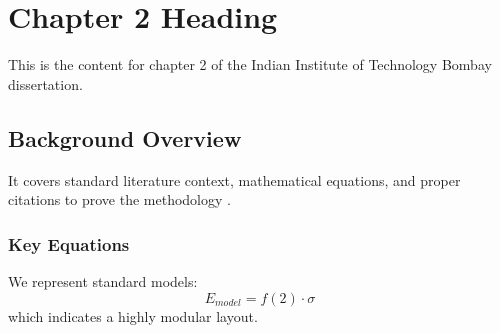 \chapter{Chapter 2 Heading}
\label{ch:chapter2}
This is the content for chapter 2 of the Indian Institute of Technology Bombay dissertation.

\section{Background Overview}
It covers standard literature context, mathematical equations, and proper citations to prove the methodology \cite{texbook}.

\subsection{Key Equations}
We represent standard models:
\begin{equation}
    E_{model} = f(2) \cdot \sigma
\end{equation}
which indicates a highly modular layout.
